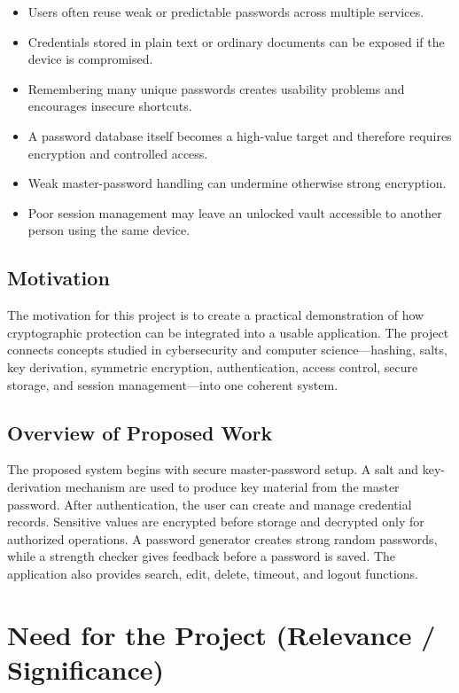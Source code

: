 \documentclass[12pt,a4paper,oneside]{report}
\begin{document}
\begin{itemize}
\item Users often reuse weak or predictable passwords across multiple services.
\item Credentials stored in plain text or ordinary documents can be exposed if the device is compromised.
\item Remembering many unique passwords creates usability problems and encourages insecure shortcuts.
\item A password database itself becomes a high-value target and therefore requires encryption and controlled access.
\item Weak master-password handling can undermine otherwise strong encryption.
\item Poor session management may leave an unlocked vault accessible to another person using the same device.
\end{itemize}

\subsection{Motivation}

The motivation for this project is to create a practical demonstration of how cryptographic protection can be integrated into a usable application. The project connects concepts studied in cybersecurity and computer science—hashing, salts, key derivation, symmetric encryption, authentication, access control, secure storage, and session management—into one coherent system.

\subsection{Overview of Proposed Work}

The proposed system begins with secure master-password setup. A salt and key-derivation mechanism are used to produce key material from the master password. After authentication, the user can create and manage credential records. Sensitive values are encrypted before storage and decrypted only for authorized operations. A password generator creates strong random passwords, while a strength checker gives feedback before a password is saved. The application also provides search, edit, delete, timeout, and logout functions.

\section{Need for the Project (Relevance / Significance)}
\end{document}
